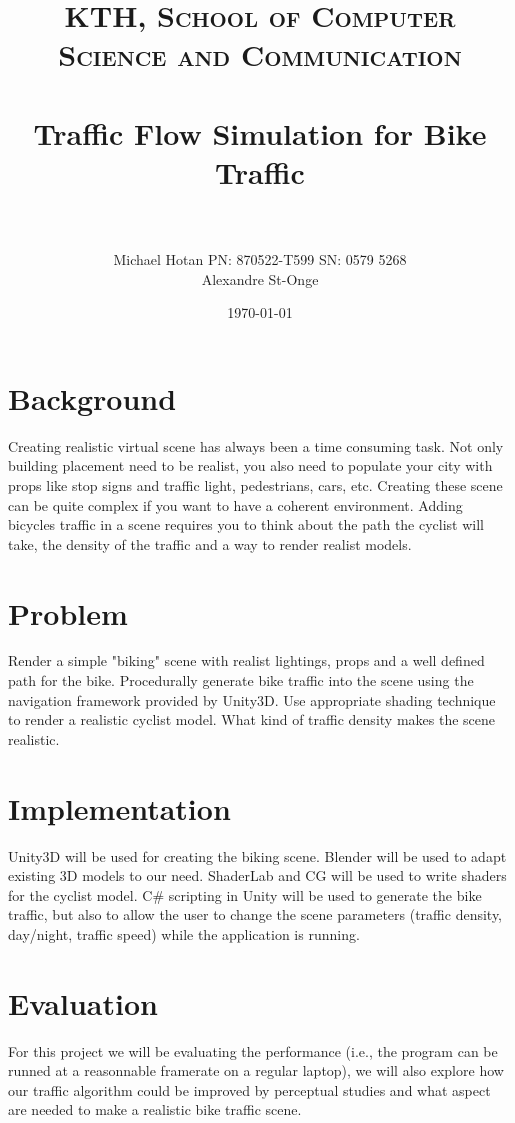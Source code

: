 \documentclass[paper=a4, fontsize=11pt]{scrartcl} %
\title{	
\normalfont \normalsize 
\textsc{KTH, School of Computer Science and Communication } \\ [25pt] %
\horrule{0.5pt} \\[0.4cm] %
\huge Traffic Flow Simulation for Bike Traffic\\ %
\horrule{2pt} \\[0.5cm] %
}
\author{Michael Hotan PN: 870522-T599 SN: 0579 5268\\ Alexandre St-Onge}
\date{\normalsize\today} %
\begin{document}
\maketitle %


\section*{Background}

Creating realistic virtual scene has always been a time consuming task. Not only building placement need to be realist, you also 
need to populate your city with props like stop signs and traffic light, pedestrians, cars, etc. Creating these scene can be quite 
complex if you want to have a coherent environment. Adding bicycles traffic in a scene requires you to think about the path the 
cyclist will take, the density of the traffic and a way to render realist models. 
	
\section*{Problem}

Render a simple "biking" scene with realist lightings, props and a well defined path for the bike. Procedurally generate bike traffic 
into the scene using the navigation framework provided by Unity3D. Use appropriate shading technique to render a realistic cyclist 
model. What kind of traffic density makes the scene realistic.
	
\section*{Implementation}

Unity3D will be used for creating the biking scene. Blender will be used to adapt existing 3D models to our need. ShaderLab and CG 
will be used to write shaders for the cyclist model. C\# scripting in Unity will be used to generate the bike traffic, but also to allow the 
user to change the scene parameters (traffic density, day/night, traffic speed) while the application is running.


\section*{Evaluation}

For this project we will be evaluating the performance (i.e., the program can be runned at a reasonnable framerate on a regular laptop), 
we will also explore how our traffic algorithm could be improved by perceptual studies and what aspect are needed to make a realistic bike 
traffic scene.
\end{document}
